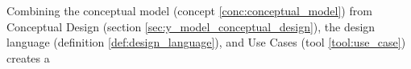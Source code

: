\begin{definition} \label{def:minimum_system_specification} 
  Combining the conceptual model (concept \ref{conc:conceptual_model}) from Conceptual Design (section \ref{sec:y_model_conceptual_design}), the design language (definition \ref{def:design_language}), and Use Cases (tool \ref{tool:use_case}) creates a \todo
\end{definition}